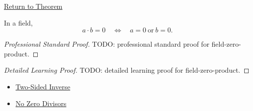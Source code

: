 \newpage
{}
\label{prf:field-zero-product}

\begin{remark*}[Return]
\hyperref[thm:field-zero-product]{Return to Theorem}
\end{remark*}

\begin{theorem*}
In a field,
\[
a\cdot b=0
\quad\Longleftrightarrow\quad
a=0\ \text{or}\ b=0.
\]
\end{theorem*}

\begin{proof}[Professional Standard Proof]
\LRAProofBodyStart
TODO: professional standard proof for field-zero-product.
\end{proof}

\begin{proof}[Detailed Learning Proof]
\LRAProofBodyStart
TODO: detailed learning proof for field-zero-product.
\end{proof}

\begin{remark*}
\end{remark*}

\begin{dependencies}
\begin{itemize}
  \item \hyperref[def:two-sided-inverse]{Two-Sided Inverse}
  \item \hyperref[thm:no-zero-divisors]{No Zero Divisors}
\end{itemize}
\end{dependencies}

\clearpage
